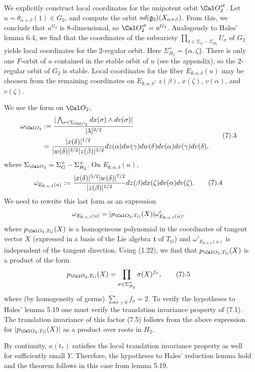 We explicitly construct
local coordinates for the unipotent orbit ${\Cal O}_2^{st}$.
Let $u=\theta_{\alpha+\beta }(1)\in G_2$, and compute
the orbit $ad({\frak g}_2)(X_{\alpha+\beta })$.
From this, we conclude that $u^{G_2}$
is 8-dimensional, so ${\Cal O}_2^{st}=u^{G_2}$. 
Analogously to Hales' lemma 6.4,
we find that the coordinates of the subvariety
$\prod_{\sigma\in \Sigma_G-\Sigma_{H_2}}U_\sigma$
of $G_2$ yields local coordinates for the $2$-regular orbit.
Here $\Sigma_{H_2}^+=\{\alpha,\zeta\}$.
There is only one $F$-orbit of $u$ contained in the stable orbit of $u$
(see the appendix), so the $2$-regular orbit of $G_2$ is stable.  
Local coordinates for the fiber $E_{\emptyset,\alpha,\delta}(u)$
may be choosen from the remaining coordinates on
$E_{\emptyset,\alpha,\delta}$:  $z(\beta)$, $x(\zeta)$,
$v(\alpha)$, and $v(\zeta)$. 
\par
We use the form on ${\Cal O}_2$,
$$
\split
\omega_{{\Cal O}_2}
&:={|\bigwedge_{\sigma\in \Sigma_{{\Cal O}_2}}dx(\sigma)\wedge dv(\sigma)|
\over |\lambda|^{3/2}}\\
&={|x(\delta)|^{1/2}\over |w(\delta)|^{3/2}|z(\beta)|^{3/2}}
dz(\alpha)dw(\gamma)dw(\delta)dv(\alpha)dv(\gamma)dv(\delta),
\endsplit
\tag 7.3
$$
where $\Sigma_{{\Cal O}_3}=\Sigma_{G}^+ -\Sigma_{H_2}^+$.
On $E_{\emptyset,\alpha,\delta}(u)$,
$$
\omega_{E_{\emptyset,\alpha,\delta}(u)}:=
{{|x(\delta)|^{5/2}}|w(\delta)|^{7/2}\over{|z(\beta)|^{1/2}}}
dz(\beta)dx(\zeta)dv(\alpha)dv(\zeta).
\tag 7.4
$$
We need to rewrite this last form as an expression
$$
\omega_{E_{\emptyset,\alpha,\delta}(u)}=
|p_{{\Cal O}_2,T_G}(X)|\omega'_{E_{\emptyset,\alpha,\delta}(u)},
$$
where $p_{{\Cal O}_2,T_G}(X)$ is a homogeneous polynomial in the coordinates
of tangent vector $X$ (expressed in a basis of the Lie algebra 
${\frak t}$ of $T_G$) and $\omega'_{E_{\emptyset,\alpha,\delta}(u)}$
is independent of the tangent direction. 
Using (1.22), we find that $p_{{\Cal O}_2,T_G}(X)$ is a product of the form
$$
p_{{\Cal O}_2,T_G}(X)=\prod_{\sigma \in \Sigma_{H_2}^+}\sigma(X)^{f_\sigma},
\tag 7.5
$$
where (by homogeneity of germs)
$\sum_{\sigma >0}f_\sigma =2$. To verify the hypotheses to Hales'
lemma 5.19 one must verify the translation invariance property
of (7.1). The translation invariance of this factor (7.5)
follows from the above expression for
$|p_{{\Cal O}_2,T_G}(X)|$ as a product over roots in $H_2$. 
\par
By continuity, $\kappa(t_*)$ satisfies the 
local translation invariance property as well for sufficiently small $Y$.
Therefore, the hypotheses to Hales' reduction lemma hold and the 
theorem follows in this case from lemma 5.19.

\enddocument



